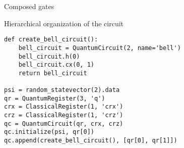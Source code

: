 \begin{frame}[fragile]{Composed gates}

Hierarchical organization of the circuit

\begin{verbatim}
def create_bell_circuit():
	bell_circuit = QuantumCircuit(2, name='bell')
	bell_circuit.h(0)
	bell_circuit.cx(0, 1)
	return bell_circuit

psi = random_statevector(2).data
qr = QuantumRegister(3, 'q')
crx = ClassicalRegister(1, 'crx')
crz = ClassicalRegister(1, 'crz')
qc = QuantumCircuit(qr, crx, crz)
qc.initialize(psi, qr[0])
qc.append(create_bell_circuit(), [qr[0], qr[1]])
\end{verbatim}
\end{frame}